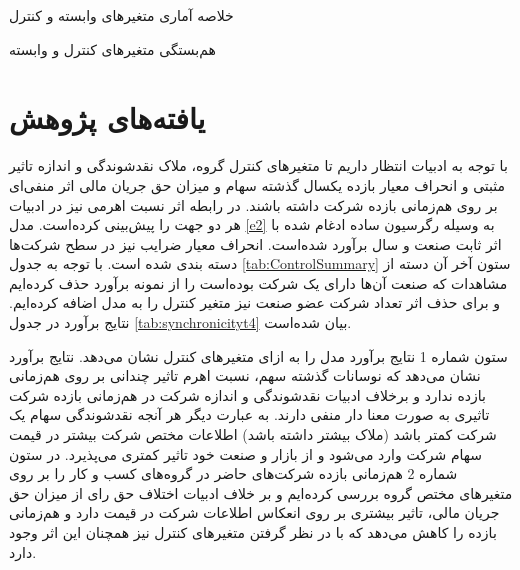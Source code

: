 \documentclass[12pt, a4paper]{article}
\begin{document}
  
  
		\begin{table}[htbp]
  	\centering
  	\caption{خلاصه آماری متغیر‌های وابسته و کنترل}
  			\label{tab:ControlSummary}
  	\begin{LTR}
  	\resizebox{0.75\textwidth}{!}{
  		
  	
  	}
  \end{LTR}
    \end{table}

		\begin{table}[htbp]
	\centering
	\caption{هم‌بستگی متغیر‌های کنترل و وابسته}
	\label{tab:CorrelationTable}
	\begin{LTR}
		\resizebox{1\textwidth}{!}{
			
			
		}
	\end{LTR}
\end{table}


  
  \FloatBarrier
\section{یافته‌های پژوهش}

با توجه به ادبیات انتظار داریم تا متغیر‌های کنترل گروه، ملاک نقدشوندگی و اندازه تاثیر مثبتی و  انحراف معیار بازده  یکسال گذشته سهام و میزان حق جریان مالی اثر منفی‌ای بر روی هم‌زمانی بازده شرکت داشته باشند. در رابطه اثر نسبت اهرمی نیز در ادبیات هر دو جهت را پیش‌بینی کرده‌است.
 مدل 
\ref{e2}
به وسیله رگرسیون ساده ادغام شده 
با اثر ثابت صنعت و سال برآورد شده‌است. انحراف معیار ضرایب نیز در سطح شرکت‌ها دسته بندی شده است. با توجه به جدول 
\ref{tab:ControlSummary}
ستون آخر آن دسته از مشاهدات که صنعت آن‌ها دارای یک شرکت بوده‌است را از نمونه  برآورد حذف کرده‌ایم و برای حذف اثر تعداد شرکت عضو صنعت نیز متغیر کنترل 
 را به مدل اضافه کرده‌ایم.
 نتایج برآورد در جدول 
\ref{tab:synchronicityt4}
بیان شده‌است.

ستون شماره 1 نتایج برآورد مدل را به ازای متغیر‌های کنترل نشان می‌دهد. نتایج برآورد نشان می‌دهد که نوسانات گذشته سهم، نسبت اهرم تاثیر چندانی بر روی هم‌زمانی بازده ندارد و برخلاف ادبیات نقدشوندگی و اندازه شرکت در هم‌زمانی بازده شرکت تاثیری به صورت معنا دار منفی دارند. به عبارت دیگر هر آنجه نقدشوندگی سهام یک شرکت کمتر باشد (ملاک 
بیشتر داشته باشد) اطلاعات مختص شرکت بیشتر در قیمت سهام شرکت وارد می‌شود و از بازار و صنعت خود تاثیر کمتری می‌پذیرد. 
در ستون شماره 2 هم‌زمانی بازده شرکت‌های حاضر در گروه‌های کسب و کار را بر روی متغیر‌های مختص گروه بررسی کرده‌ایم و بر خلاف ادبیات اختلاف حق رای از میزان حق  جریان مالی، تاثیر بیشتری بر روی انعکاس اطلاعات شرکت در قیمت دارد و هم‌زمانی بازده را کاهش می‌دهد که با در نظر گرفتن متغیر‌های کنترل نیز همچنان این اثر وجود دارد.
\end{document}

